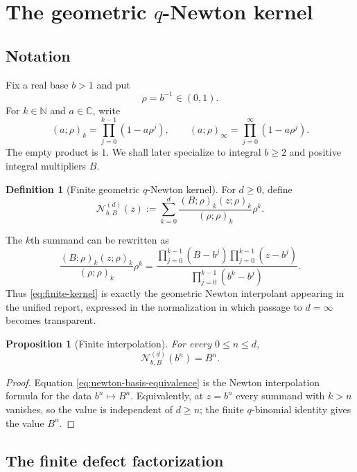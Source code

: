 \documentclass[11pt]{article}
\newtheorem{proposition}[theorem]{Proposition}
\theoremstyle{definition}
\newtheorem{definition}[theorem]{Definition}
\newcommand{\Nker}{\mathscr{N}}
\newcommand{\C}{\mathbb{C}}
\newcommand{\N}{\mathbb{N}}
\newcommand{\qpf}[3]{\left(#1;#2\right)_{#3}}
\newcommand{\qpi}[2]{\left(#1;#2\right)_{\!\infty}}
\begin{document}
\section{The geometric $q$-Newton kernel}

\subsection{Notation}

Fix a real base $b>1$ and put
\[
 \rho=b^{-1}\in(0,1).
\]
For $k\in\N$ and $a\in\C$, write
\[
 \qpf{a}{\rho}{k}=\prod_{j=0}^{k-1}(1-a\rho^j),
 \qquad
 \qpi{a}{\rho}=\prod_{j=0}^{\infty}(1-a\rho^j).
\]
The empty product is $1$.  We shall later specialize to integral $b\ge2$ and positive integral multipliers $B$.

\begin{definition}[Finite geometric $q$-Newton kernel]
For $d\ge0$, define
\begin{equation}\label{eq:finite-kernel}
 \Nker^{(d)}_{b,B}(z)
 :=\sum_{k=0}^{d}
 \frac{\qpf{B}{\rho}{k}\qpf{z}{\rho}{k}}
      {\qpf{\rho}{\rho}{k}}\rho^k.
\end{equation}
\end{definition}

The $k$th summand can be rewritten as
\begin{equation}\label{eq:newton-basis-equivalence}
 \frac{\qpf{B}{\rho}{k}\qpf{z}{\rho}{k}}
      {\qpf{\rho}{\rho}{k}}\rho^k
 =
 \frac{\displaystyle\prod_{j=0}^{k-1}(B-b^j)
       \prod_{j=0}^{k-1}(z-b^j)}
      {\displaystyle\prod_{j=0}^{k-1}(b^k-b^j)}.
\end{equation}
Thus \eqref{eq:finite-kernel} is exactly the geometric Newton interpolant appearing in the unified report, expressed in the normalization in which passage to $d=\infty$ becomes transparent.

\begin{proposition}[Finite interpolation]\label{prop:finite-interpolation}
For every $0\le n\le d$,
\[
 \Nker^{(d)}_{b,B}(b^n)=B^n.
\]
\end{proposition}

\begin{proof}
Equation \eqref{eq:newton-basis-equivalence} is the Newton interpolation formula for the data $b^n\mapsto B^n$.  Equivalently, at $z=b^n$ every summand with $k>n$ vanishes, so the value is independent of $d\ge n$; the finite $q$-binomial identity gives the value $B^n$.
\end{proof}

\subsection{The finite defect factorization}
\end{document}
